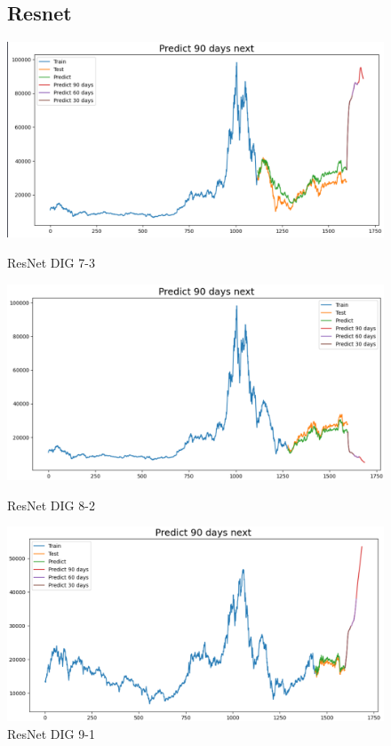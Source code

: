 \documentclass[conference]{IEEEtran}
\begin{document}
\begin{enumerate}
\begin{figure}[htbp]
\subsection{Resnet}
\centering
    \begin{minipage}{0.23\textwidth}
    \centering
    \includegraphics[width=1\textwidth]{experiment/resnet/DIG 7_3.png}
    \caption{ResNet DIG 7-3}
    \label{fig:nvl_boxplot}
    \end{minipage}
    \hfill
    \begin{minipage}{0.23\textwidth}
    \centering
    \includegraphics[width=1\textwidth]{experiment/resnet/DIG 8_2.png}
    \caption{ResNet DIG 8-2}
    \label{fig:nvl_histogram}
    \end{minipage}
    \begin{minipage}{0.23\textwidth}
    \centering
    \includegraphics[width=1\textwidth]{experiment/resnet/DIG 9_1.png}
    \caption{ResNet DIG 9-1}
    \label{fig:nvl_histogram}
    \end{minipage}


\end{figure}
\end{enumerate}
\end{document}
